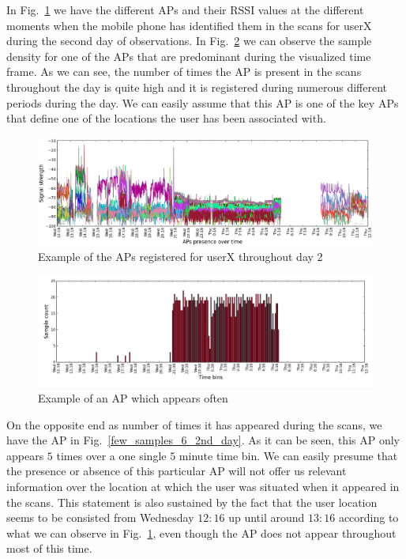 In Fig.~\ref{rssi_6_2nd_day} we have the different APs and their RSSI values at
the different moments when the mobile phone has identified them in the scans for
userX during the second day of observations. In Fig.~\ref{samples_6_2nd_day} we
can observe the sample density for one of the APs that are predominant during
the visualized time frame. As we can see, the number of times the AP is present
in the scans throughout the day is quite high and it is registered during
numerous different periods during the day. We can easily assume that this AP is
one of the key APs that define one of the locations the user has been associated
with.

\begin{figure}[h]
\centering
\includegraphics[width
=\textwidth, height =
0.4\textwidth]{figures/combinations/user_6_sorted_1days_plot_croped.png}
\caption{Example of the APs registered for userX throughout day 2}
\label{rssi_6_2nd_day}
\end{figure}

\begin{figure}[h]
\centering
\includegraphics[width
=\textwidth, height =
0.4\textwidth]{figures/combinations/user_6_sorted_1days_plot_14280_histo.png}
\caption{Example of an AP which appears often}
\label{samples_6_2nd_day}
\end{figure}

On the opposite end as number of times it has appeared during the scans, we have
the AP in Fig.~\ref{few_samples_6_2nd_day}. As it can be seen, this AP only
appears $5$ times over a one single $5$ minute time bin. We can easily presume
that the presence or absence of this particular AP will not offer us relevant
information over the location at which the user was situated when it appeared in
the scans. This statement is also sustained by the fact that the user location
seems to be consisted from Wednesday $12:16$ up until around $13:16$ according
to what we can observe in Fig.~\ref{rssi_6_2nd_day}, even though the AP does not appear
throughout most of this time.

